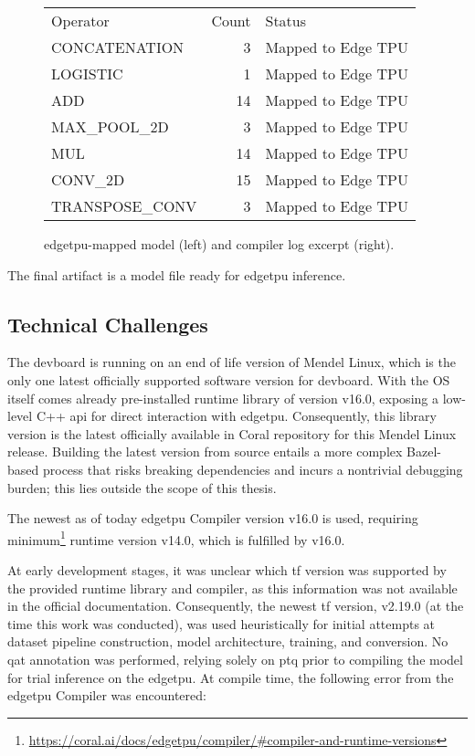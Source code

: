 {\begin{figure}[htbp]
\begin{minipage}[t]{0.74\textwidth}
    \vspace{0.5em}
    \begin{tabular}{@{}lrl@{}}
      Operator & Count & Status \\[0.5em]  %
      CONCATENATION & 3  & Mapped to Edge TPU \\
      LOGISTIC      & 1  & Mapped to Edge TPU \\
      ADD           & 14 & Mapped to Edge TPU \\
      MAX\_POOL\_2D & 3  & Mapped to Edge TPU \\
      MUL           & 14 & Mapped to Edge TPU \\
      CONV\_2D      & 15 & Mapped to Edge TPU \\
      TRANSPOSE\_CONV & 3 & Mapped to Edge TPU
    \end{tabular}
    \vspace*{\fill}        %
\end{minipage}
\caption{\gls{edgetpu}-mapped model (left) and compiler log excerpt (right).}
\label{fig:successcompile}
\end{figure}

The final artifact is a  model file ready for \gls{edgetpu} inference.

\subsection*{Technical Challenges}

The \gls{devboard} is running on an end of life version of Mendel Linux, which is the only one latest officially supported software version for \gls{devboard}.
With the OS itself comes already pre-installed runtime library  of version v16.0, exposing a low-level C++ \gls{api}
for direct interaction with \gls{edgetpu}. Consequently, this library version is the latest officially available in Coral repository for this Mendel Linux release.
Building the latest version from source entails a more complex Bazel-based process that risks breaking dependencies and incurs a nontrivial debugging burden; 
this lies outside the scope of this thesis.

The newest as of today \gls{edgetpu} Compiler version v16.0 is used,
requiring minimum\footnote{\url{https://coral.ai/docs/edgetpu/compiler/\#compiler-and-runtime-versions}} runtime version v14.0,
which is fulfilled by  v16.0.

At early development stages, it was unclear which \gls{tf} version was supported by the provided runtime library and compiler,
as this information was not available in the official documentation.
Consequently, the newest \gls{tf} version, v2.19.0 (at the time this work was conducted), was used heuristically for initial attempts at dataset pipeline construction,
model architecture, training, and conversion.
No \gls{qat} annotation was performed, relying solely on \gls{ptq} prior to compiling the model for trial inference on the \gls{edgetpu}.
At compile time, the following error from the \gls{edgetpu} Compiler was encountered:

}
